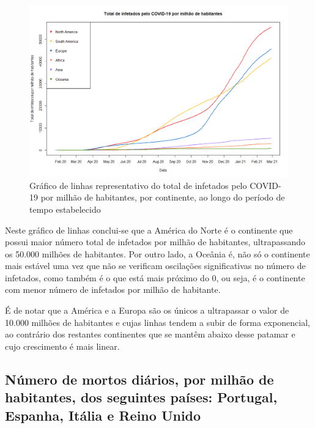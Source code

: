 \documentclass[conference]{IEEEtran}
\begin{document}
\begin{figure}[htbp]
\centerline{\includegraphics[width=0.95\columnwidth]{images/01.b.png}}
\caption{Gráfico de linhas representativo do total de infetados pelo COVID-19 por milhão de habitantes, por continente, ao longo do período de tempo estabelecido}
\label{fig}
\end{figure}

Neste gráfico de linhas conclui-se que a América do Norte é o continente que possui maior número total de infetados por milhão de habitantes, ultrapassando os 50.000 milhões de habitantes. Por outro lado, a Oceânia é, não só o continente mais estável uma vez que não se verificam oscilações significativas no número de infetados, como também é o que está mais próximo do 0, ou seja, é o continente com menor número de infetados por milhão de habitante.

É de notar que a América e a Europa são os únicos a ultrapassar o valor de 10.000 milhões de habitantes e cujas linhas tendem a subir de forma exponencial, ao contrário dos restantes continentes que se mantêm abaixo desse patamar e cujo crescimento é mais linear.


\subsection{Número de mortos diários, por milhão de habitantes, dos seguintes países: Portugal, Espanha, Itália e Reino Unido}
\end{document}
